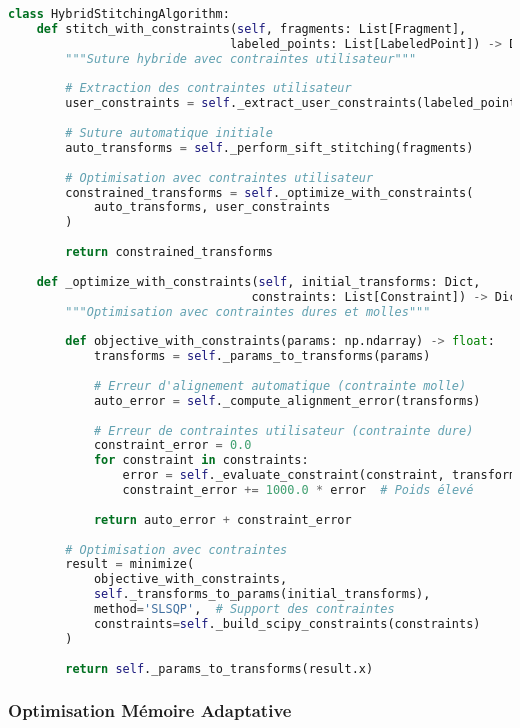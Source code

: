 \documentclass[12pt,a4paper]{report}
\begin{document}
\begin{lstlisting}[language=Python]
class HybridStitchingAlgorithm:
    def stitch_with_constraints(self, fragments: List[Fragment], 
                               labeled_points: List[LabeledPoint]) -> Dict[str, Transform]:
        """Suture hybride avec contraintes utilisateur"""
        
        # Extraction des contraintes utilisateur
        user_constraints = self._extract_user_constraints(labeled_points)
        
        # Suture automatique initiale
        auto_transforms = self._perform_sift_stitching(fragments)
        
        # Optimisation avec contraintes utilisateur
        constrained_transforms = self._optimize_with_constraints(
            auto_transforms, user_constraints
        )
        
        return constrained_transforms
    
    def _optimize_with_constraints(self, initial_transforms: Dict, 
                                  constraints: List[Constraint]) -> Dict:
        """Optimisation avec contraintes dures et molles"""
        
        def objective_with_constraints(params: np.ndarray) -> float:
            transforms = self._params_to_transforms(params)
            
            # Erreur d'alignement automatique (contrainte molle)
            auto_error = self._compute_alignment_error(transforms)
            
            # Erreur de contraintes utilisateur (contrainte dure)
            constraint_error = 0.0
            for constraint in constraints:
                error = self._evaluate_constraint(constraint, transforms)
                constraint_error += 1000.0 * error  # Poids élevé
            
            return auto_error + constraint_error
        
        # Optimisation avec contraintes
        result = minimize(
            objective_with_constraints,
            self._transforms_to_params(initial_transforms),
            method='SLSQP',  # Support des contraintes
            constraints=self._build_scipy_constraints(constraints)
        )
        
        return self._params_to_transforms(result.x)
\end{lstlisting}

\subsubsection{Optimisation Mémoire Adaptative}
\end{document}
